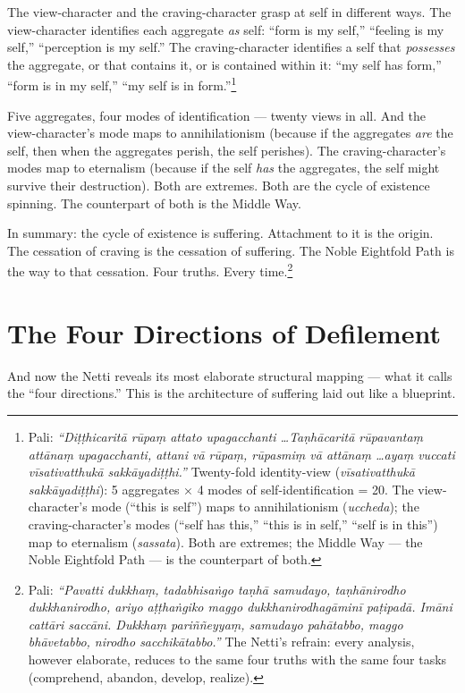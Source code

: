 The view-character and the craving-character grasp at self in different ways. The view-character identifies each aggregate \textit{as} self: ``form is my self,'' ``feeling is my self,'' ``perception is my self.'' The craving-character identifies a self that \textit{possesses} the aggregate, or that contains it, or is contained within it: ``my self has form,'' ``form is in my self,'' ``my self is in form.''\footnote{Pali: \textit{``Diṭṭhicaritā rūpaṃ attato upagacchanti \ldots Taṇhācaritā rūpavantaṃ attānaṃ upagacchanti, attani vā rūpaṃ, rūpasmiṃ vā attānaṃ \ldots ayaṃ vuccati vīsativatthukā sakkāyadiṭṭhi.''} Twenty-fold identity-view (\textit{vīsativatthukā sakkāyadiṭṭhi}): 5 aggregates × 4 modes of self-identification = 20. The view-character's mode (``this is self'') maps to annihilationism (\textit{uccheda}); the craving-character's modes (``self has this,'' ``this is in self,'' ``self is in this'') map to eternalism (\textit{sassata}). Both are extremes; the Middle Way --- the Noble Eightfold Path --- is the counterpart of both.}

Five aggregates, four modes of identification --- twenty views in all. And the view-character's mode maps to annihilationism (because if the aggregates \textit{are} the self, then when the aggregates perish, the self perishes). The craving-character's modes map to eternalism (because if the self \textit{has} the aggregates, the self might survive their destruction). Both are extremes. Both are the cycle of existence spinning. The counterpart of both is the Middle Way.

In summary: the cycle of existence is suffering. Attachment to it is the origin. The cessation of craving is the cessation of suffering. The Noble Eightfold Path is the way to that cessation. Four truths. Every time.\footnote{Pali: \textit{``Pavatti dukkhaṃ, tadabhisaṅgo taṇhā samudayo, taṇhānirodho dukkhanirodho, ariyo aṭṭhaṅgiko maggo dukkhanirodhagāminī paṭipadā. Imāni cattāri saccāni. Dukkhaṃ pariññeyyaṃ, samudayo pahātabbo, maggo bhāvetabbo, nirodho sacchikātabbo.''} The Netti's refrain: every analysis, however elaborate, reduces to the same four truths with the same four tasks (comprehend, abandon, develop, realize).}

\section*{The Four Directions of Defilement}

And now the Netti reveals its most elaborate structural mapping --- what it calls the ``four directions.'' This is the architecture of suffering laid out like a blueprint.


